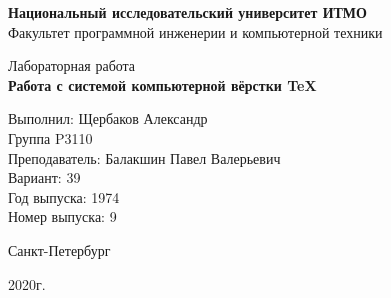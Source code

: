 \thispagestyle{empty}
\begin{center}
    {\bfseries Национальный исследовательский университет ИТМО}\\
    Факультет программной инженерии и компьютерной техники

    \vspace{30em}

    {\large Лабораторная работа }\\
    {\Large \textbf{Работа с системой компьютерной вёрстки \TeX}}
\end{center}

\vspace{20em}

\begin{flushright}
    Выполнил:
    Щербаков Александр \\
    Группа P3110\\
    Преподаватель:
    Балакшин Павел Валерьевич\\
    Вариант: 39\\
    Год выпуска: 1974\\
    Номер выпуска: 9 \\
\end{flushright}

\vspace{\fill}

\begin{center}
Санкт-Петербург

2020г.
\end{center}

